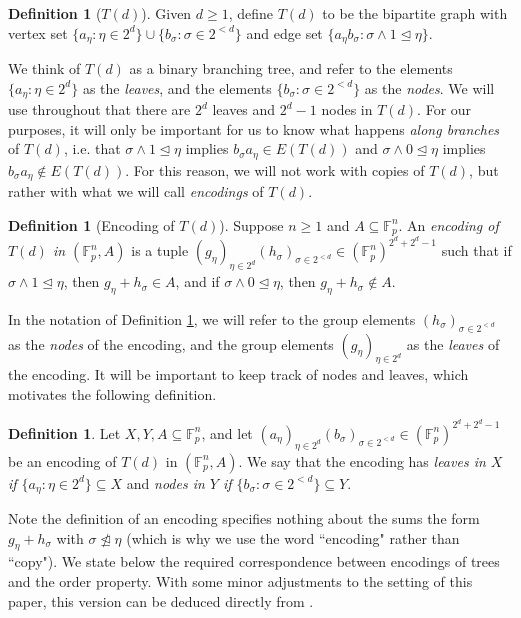 \documentclass[12pt,oneside,british,a4wide]{amsart}
\numberwithin{equation}{section}
\theoremstyle{definition}
\newtheorem{definition}[theorem]{Definition}
\def\F{\mathbb{F}}
\begin{document}
\begin{definition}[$T(d)$]
Given $d\geq 1$, define $T(d)$ to be the bipartite graph with vertex set $\{a_\eta: \eta\in 2^d\}\cup \{b_{\sigma}: \sigma\in 2^{<d}\}$ and edge set $\{a_{\eta}b_{\sigma}: \sigma \wedge 1\trianglelefteq \eta\}$. 
\end{definition}

We think of $T(d)$ as a binary branching tree, and refer to the elements $\{a_\eta: \eta\in 2^d\}$ as the \emph{leaves}, and the elements $\{b_{\sigma}: \sigma\in 2^{<d}\}$ as the \emph{nodes}.  We will use throughout that there are $2^d$ leaves and $2^d-1$ nodes in $T(d)$.  For our purposes, it will only be important for us to know what happens  \emph{along branches} of $T(d)$, i.e. that $\sigma\wedge 1\trianglelefteq \eta$ implies $b_{\sigma}a_{\eta}\in E(T(d))$ and $\sigma\wedge 0\trianglelefteq \eta$ implies $b_{\sigma}a_{\eta}\notin E(T(d))$.  For this reason, we will not work with  copies of $T(d)$, but rather with what we will call \emph{encodings} of $T(d)$.

\begin{definition}[Encoding of $T(d)$]\label{def:encoding}
Suppose $n\geq 1$ and $A\subseteq \F_p^n$. An \emph{encoding of $T(d)$ in $(\F_p^n,A)$} is a tuple $(g_{\eta})_{\eta\in 2^d}(h_{\sigma})_{\sigma\in 2^{<d}}\in (\F_p^n)^{2^d+2^d-1}$ such that if $\sigma \wedge 1\trianglelefteq \eta$, then $g_{\eta}+h_{\sigma}\in A$, and if $\sigma \wedge 0\trianglelefteq \eta$, then $g_{\eta}+h_{\sigma}\notin A$.
\end{definition}

In the notation of Definition \ref{def:encoding}, we will refer to the group elements $(h_{\sigma})_{\sigma\in 2^{<d}}$ as the \emph{nodes} of the encoding, and the group elements $(g_{\eta})_{\eta\in 2^{d}}$ as the \emph{leaves} of the encoding.   It will be important to keep track of nodes and leaves, which motivates the following definition.

\begin{definition}\label{def:nodesleaves1}
Let $X,Y,A\subseteq \F_p^n$,  and let $(a_{\eta})_{\eta\in 2^d}(b_{\sigma})_{\sigma\in 2^{<d}} \in (\F_p^n)^{2^{d}+2^d-1}$ be an encoding of $T(d)$ in $(\F_p^n,A)$.  We say that the encoding has \emph{leaves in $X$ if $\{a_\eta: \eta\in 2^d\}\subseteq X$} and \emph{nodes in $Y$ if $\{b_{\sigma}:\sigma\in 2^{<d}\}\subseteq Y$}.
\end{definition}

Note the definition of an encoding specifies nothing about the sums the form $g_{\eta}+h_{\sigma}$ with $\sigma \ntrianglelefteq \eta$ (which is why we use the word ``encoding" rather than ``copy").  We state below the required correspondence between encodings of trees and the order property. With some minor adjustments to the setting of this paper, this version can be deduced directly from \cite{Hodges.1981}.
\end{document}
